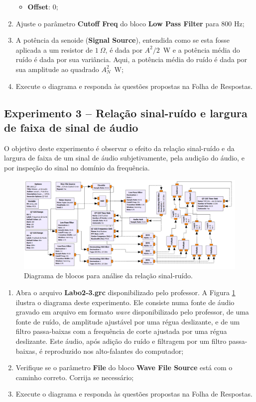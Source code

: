 \documentclass[12pt,addpoints]{exam}
\newcommand{\myscale}{0.4}
\begin{document}
\begin{enumerate}
\begin{itemize}
        \item \textbf{Offset}: 0;
    \end{itemize}
    \item Ajuste o parâmetro \textbf{Cutoff Freq} do bloco \textbf{Low Pass Filter} para 800 Hz;
    \item A potência da senoide (\textbf{Signal Source}), entendida como se esta fosse aplicada a um resistor de $1~\Omega$, é dada por $A^2/2$~W e a potência média do ruído é dada por sua variância. Aqui, a potência média do ruído é dada por sua amplitude ao quadrado $A_N^2$~W;
    \item Execute o diagrama e responda às questões propostas na Folha de Respostas.
\end{enumerate}

\subsection{Experimento 3 -- Relação sinal-ruído e largura de faixa de sinal de áudio}

O objetivo deste experimento é observar o efeito da relação sinal-ruído e da largura de faixa de um sinal de áudio subjetivamente, pela audição do áudio, e por inspeção do sinal no domínio da frequência.

\begin{figure}[htb]
    \centering
    \includegraphics[scale=\myscale]{./Figuras/GRC_2-3.png}
    \caption{Diagrama de blocos para análise da relação sinal-ruído.} 
    \label{fig:GRC_2-2b}
\end{figure}

\begin{enumerate}
    \item Abra o arquivo \textbf{Labo2-3.grc} disponibilizado pelo professor. A Figura \ref{fig:GRC_2-2b} ilustra o diagrama deste experimento. Ele consiste numa fonte de áudio gravado em arquivo em formato \textit{wave} disponibilizado pelo professor, de uma fonte de ruído, de amplitude ajustável por uma régua deslizante, e de um filtro passa-baixas com a frequência de corte ajustada por uma régua deslizante. Este áudio, após adição do ruído e filtragem por um filtro passa-baixas, é reproduzido nos alto-falantes do computador;
    \item Verifique se o parâmetro \textbf{File} do bloco \textbf{Wave File Source} está com o caminho correto. Corrija se necessário;
    \item Execute o diagrama e responda às questões propostas na Folha de Respostas.
\end{enumerate}
\end{document}
